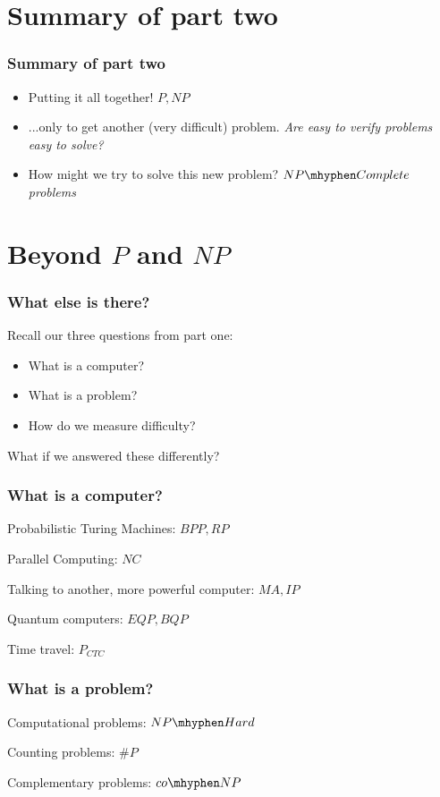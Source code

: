 \documentclass[aspectratio=169]{beamer}
\begin{document}
\section{Summary of part two}

\begin{frame}
\frametitle{Summary of part two}
\begin{itemize}
    \item Putting it all together! {\em $P, NP$}
    \item ...only to get another (very difficult) problem. {\em Are easy to verify problems easy to solve?}
    \item How might we try to solve this new problem? {\em $NP\mhyphen Complete$ problems}
\end{itemize}
\end{frame}

\section{Beyond $P$ and $NP$}

\begin{frame}
\frametitle{What else is there?}
Recall our three questions from part one:
\begin{itemize}
    \item What is a computer?
    \item What is a problem?
    \item How do we measure difficulty?
\end{itemize}
What if we answered these differently?
\end{frame}

\begin{frame}
\frametitle{What is a computer?}
Probabilistic Turing Machines: $BPP, RP$

Parallel Computing: $NC$

Talking to another, more powerful computer: $MA, IP$

Quantum computers:  $EQP, BQP$

Time travel: $P_{CTC}$
\end{frame}

\begin{frame}
\frametitle{What is a problem?}
Computational problems: $NP\mhyphen Hard$

Counting problems: $\#P$

Complementary problems: $co\mhyphen NP$
\end{frame}
\end{document}
